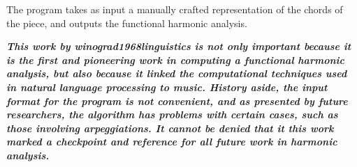 		The program takes as input a manually crafted representation of the chords of the piece, and outputs the functional harmonic analysis.

			\emph{\textbf{
				This work by winograd1968linguistics is not only important because it is the first and pioneering work in computing a functional harmonic analysis, but also because it linked the computational techniques used in natural language processing to music. History aside, the input format for the program is not convenient, and as presented by future researchers, the algorithm has problems with certain cases, such as those involving arpeggiations. It cannot be denied that it this work marked a checkpoint and reference for all future work in harmonic analysis.
			}}

\newpage
